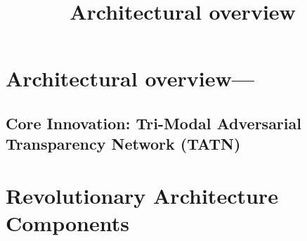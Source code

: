 \documentclass[a4paper,12pt]{article}
\begin{document}
\title{Architectural overview}
\author{}
\date{}
\maketitle

\section*{Architectural overview—}

\subsection*{Core Innovation: Tri-Modal Adversarial Transparency Network (TATN)}

\section*{Revolutionary Architecture Components}
\end{document}

